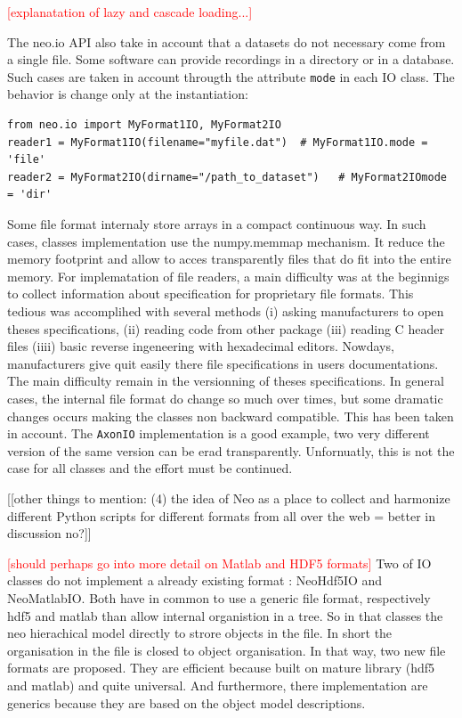 \documentclass{frontiers}
\newcommand{\missing}[1]{\textcolor{red}{#1}}
\newcommand{\samuel}[1]{[\textcolor{RubineRed}{#1}]}
\begin{document}
\missing{[explanatation of lazy and cascade loading...]}



The neo.io API also take in account that a datasets do not necessary come from a single file. Some software can provide recordings in a directory or in a database. Such cases are taken in account througth the attribute \lstinline`mode` in each IO class. The behavior is change only at the instantiation:

\begin{lstlisting}[style=display]
from neo.io import MyFormat1IO, MyFormat2IO
reader1 = MyFormat1IO(filename="myfile.dat")  # MyFormat1IO.mode = 'file'
reader2 = MyFormat2IO(dirname="/path_to_dataset")   # MyFormat2IOmode = 'dir'
\end{lstlisting}

Some file format internaly store arrays in a compact continuous way. In such cases, classes implementation use the numpy.memmap mechanism. It reduce the memory footprint and allow to acces transparently files that do fit into the entire memory.
For implematation of file readers, a main difficulty was at the beginnigs to collect information about specification for proprietary file formats. This tedious was accomplihed with several methods (i) asking manufacturers to open theses specifications, (ii) reading code from other package (iii) reading C header files (iiii) basic reverse ingeneering with hexadecimal editors. Nowdays, manufacturers give quit easily there file specifications in users documentations.
The main difficulty remain in the versionning of theses specifications. In general cases, the internal file format do change so much over times, but some dramatic  changes occurs making the classes non backward compatible. This has been taken in account. The \lstinline`AxonIO` implementation is a good example, two very different version of the same version can be erad transparently. Unfornuatly, this is not the case for all classes and the effort must be continued.

\samuel{[other things to mention: (4) the idea of Neo as a place to collect and harmonize different Python scripts for different formats from all over the web = better in discussion no?]}


\missing{[should perhaps go into more detail on Matlab and HDF5 formats]}
Two of IO classes do not implement a already existing format : NeoHdf5IO and NeoMatlabIO. Both have in common to use a generic file format, respectively hdf5 and matlab than allow internal organistion in a tree. So in that classes the neo hierachical model directly to strore objects in the file. In short the organisation in the file is closed to object organisation. In that way, two new file formats are proposed. They are efficient because built on mature library (hdf5 and matlab) and quite universal. And furthermore, there implementation are generics because they are based on the object model descriptions.
\end{document}
